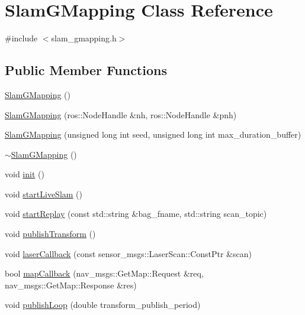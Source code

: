 \hypertarget{classSlamGMapping}{}\section{Slam\+G\+Mapping Class Reference}
\label{classSlamGMapping}


{\ttfamily \#include $<$slam\+\_\+gmapping.\+h$>$}

\subsection*{Public Member Functions}
\begin{DoxyCompactItemize}
\item 
\hyperlink{classSlamGMapping_aa40ca229b3db4d0cf5bf7448c475a4c3}{Slam\+G\+Mapping} ()
\item 
\hyperlink{classSlamGMapping_a3f9432f78c6eff17041a4b0b0f87a1ad}{Slam\+G\+Mapping} (ros\+::\+Node\+Handle \&nh, ros\+::\+Node\+Handle \&pnh)
\item 
\hyperlink{classSlamGMapping_a6a4853715facc1ee2591955180e830a2}{Slam\+G\+Mapping} (unsigned long int seed, unsigned long int max\+\_\+duration\+\_\+buffer)
\item 
\hyperlink{classSlamGMapping_ae4a539b79ee1f11b7430f313ad445667}{$\sim$\+Slam\+G\+Mapping} ()
\item 
void \hyperlink{classSlamGMapping_aca7f6aaa57c8ac675068701adda348ea}{init} ()
\item 
void \hyperlink{classSlamGMapping_ab0d5567e7a8e010ff11068fcce0d9c04}{start\+Live\+Slam} ()
\item 
void \hyperlink{classSlamGMapping_a90bee18e7c96af13916caae4a4bfd618}{start\+Replay} (const std\+::string \&bag\+\_\+fname, std\+::string scan\+\_\+topic)
\item 
void \hyperlink{classSlamGMapping_a2447af8faad253af05c7dc9f492b8489}{publish\+Transform} ()
\item 
void \hyperlink{classSlamGMapping_a49172a6ae33df4daf397959789dc1c34}{laser\+Callback} (const sensor\+\_\+msgs\+::\+Laser\+Scan\+::\+Const\+Ptr \&scan)
\item 
bool \hyperlink{classSlamGMapping_a780899c48f753bf4768580fb46580d83}{map\+Callback} (nav\+\_\+msgs\+::\+Get\+Map\+::\+Request \&req, nav\+\_\+msgs\+::\+Get\+Map\+::\+Response \&res)
\item 
void \hyperlink{classSlamGMapping_a00a01ecfacccbfcfccc3e138de6bd00f}{publish\+Loop} (double transform\+\_\+publish\+\_\+period)
\end{DoxyCompactItemize}


